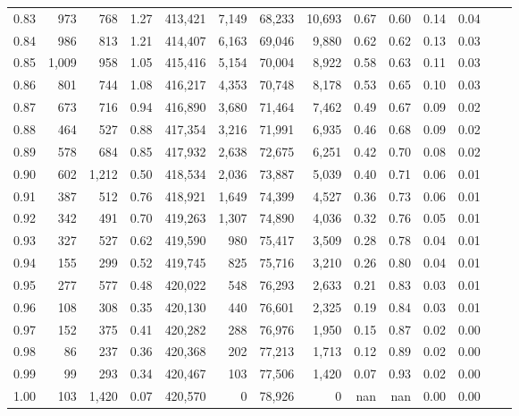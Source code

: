 \begin{tabular}{rrrrrrrrrrrrrr}
0.83 &     973 &    768 &    1.27 &  413,421 &    7,149 &  68,233 &  10,693 &  0.67 &  0.60 &  0.14 &      0.04 \\
0.84 &     986 &    813 &    1.21 &  414,407 &    6,163 &  69,046 &   9,880 &  0.62 &  0.62 &  0.13 &      0.03 \\
0.85 &   1,009 &    958 &    1.05 &  415,416 &    5,154 &  70,004 &   8,922 &  0.58 &  0.63 &  0.11 &      0.03 \\
0.86 &     801 &    744 &    1.08 &  416,217 &    4,353 &  70,748 &   8,178 &  0.53 &  0.65 &  0.10 &      0.03 \\
0.87 &     673 &    716 &    0.94 &  416,890 &    3,680 &  71,464 &   7,462 &  0.49 &  0.67 &  0.09 &      0.02 \\
0.88 &     464 &    527 &    0.88 &  417,354 &    3,216 &  71,991 &   6,935 &  0.46 &  0.68 &  0.09 &      0.02 \\
0.89 &     578 &    684 &    0.85 &  417,932 &    2,638 &  72,675 &   6,251 &  0.42 &  0.70 &  0.08 &      0.02 \\
0.90 &     602 &  1,212 &    0.50 &  418,534 &    2,036 &  73,887 &   5,039 &  0.40 &  0.71 &  0.06 &      0.01 \\
0.91 &     387 &    512 &    0.76 &  418,921 &    1,649 &  74,399 &   4,527 &  0.36 &  0.73 &  0.06 &      0.01 \\
0.92 &     342 &    491 &    0.70 &  419,263 &    1,307 &  74,890 &   4,036 &  0.32 &  0.76 &  0.05 &      0.01 \\
0.93 &     327 &    527 &    0.62 &  419,590 &      980 &  75,417 &   3,509 &  0.28 &  0.78 &  0.04 &      0.01 \\
0.94 &     155 &    299 &    0.52 &  419,745 &      825 &  75,716 &   3,210 &  0.26 &  0.80 &  0.04 &      0.01 \\
0.95 &     277 &    577 &    0.48 &  420,022 &      548 &  76,293 &   2,633 &  0.21 &  0.83 &  0.03 &      0.01 \\
0.96 &     108 &    308 &    0.35 &  420,130 &      440 &  76,601 &   2,325 &  0.19 &  0.84 &  0.03 &      0.01 \\
0.97 &     152 &    375 &    0.41 &  420,282 &      288 &  76,976 &   1,950 &  0.15 &  0.87 &  0.02 &      0.00 \\
0.98 &      86 &    237 &    0.36 &  420,368 &      202 &  77,213 &   1,713 &  0.12 &  0.89 &  0.02 &      0.00 \\
0.99 &      99 &    293 &    0.34 &  420,467 &      103 &  77,506 &   1,420 &  0.07 &  0.93 &  0.02 &      0.00 \\
1.00 &     103 &  1,420 &    0.07 &  420,570 &        0 &  78,926 &       0 &   nan &   nan &  0.00 &      0.00 \\
\bottomrule
\end{tabular}
